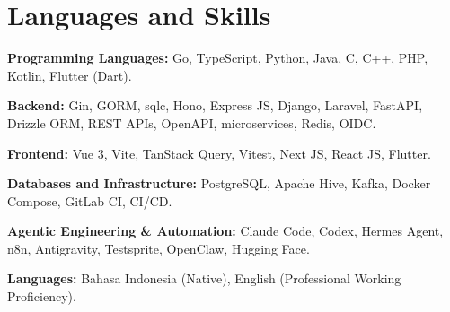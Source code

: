 \section{Languages and Skills}
\begin{cvskills}
  \item \textbf{Programming Languages:} Go, TypeScript, Python, Java, C, C++, PHP, Kotlin, Flutter (Dart).
  \item \textbf{Backend:} Gin, GORM, sqlc, Hono, Express JS, Django, Laravel, FastAPI, Drizzle ORM, REST APIs, OpenAPI, microservices, Redis, OIDC.
  \item \textbf{Frontend:} Vue 3, Vite, TanStack Query, Vitest, Next JS, React JS, Flutter.
  \item \textbf{Databases and Infrastructure:} PostgreSQL, Apache Hive, Kafka, Docker Compose, GitLab CI, CI/CD.
  \item \textbf{Agentic Engineering \& Automation:} Claude Code, Codex, Hermes Agent, n8n, Antigravity, Testsprite, OpenClaw, Hugging Face.
  \item \textbf{Languages:} Bahasa Indonesia (Native), English (Professional Working Proficiency).
\end{cvskills}
